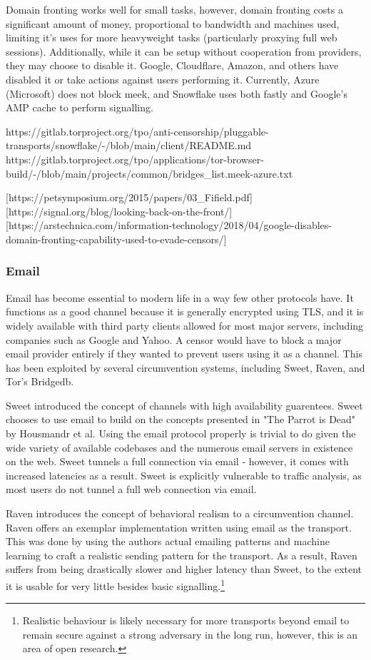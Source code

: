 \documentclass[12pt]{report}
\begin{document}
Domain fronting works well for small tasks, however, domain fronting costs a significant amount of money, proportional to bandwidth and machines used, limiting it's uses for more heavyweight tasks (particularly proxying full web sessions). Additionally, while it can be setup without cooperation from providers, they may choose to disable it. Google, Cloudflare, Amazon, and others have disabled it or take actions against users performing it. Currently, Azure (Microsoft) does not block meek, and Snowflake uses both fastly and Google's AMP cache to perform signalling.

https://gitlab.torproject.org/tpo/anti-censorship/pluggable-transports/snowflake/-/blob/main/client/README.md
https://gitlab.torproject.org/tpo/applications/tor-browser-build/-/blob/main/projects/common/bridges_list.meek-azure.txt

[https://petsymposium.org/2015/papers/03_Fifield.pdf]
[https://signal.org/blog/looking-back-on-the-front/]
[https://arstechnica.com/information-technology/2018/04/google-disables-domain-fronting-capability-used-to-evade-censors/]

\subsubsection{Email}

Email has become essential to modern life in a way few other protocols have. It functions as a good channel because it is generally encrypted using TLS, and it is widely available with third party clients allowed for most major servers, including companies such as Google and Yahoo. A censor would have to block a major email provider entirely if they wanted to prevent users using it as a channel. This has been exploited by several circumvention systems, including Sweet, Raven, and Tor's Bridgedb.

Sweet introduced the concept of channels with high availability guarentees. Sweet chooses to use email to build on the concepts presented in "The Parrot is Dead" by Housmandr et al.\cite{parrot} Using the email protocol properly is trivial to do given the wide variety of available codebases and the numerous email servers in existence on the web. Sweet tunnels a full connection via email - however, it comes with increased latencies as a result. Sweet is explicitly vulnerable to traffic analysis, as most users do not tunnel a full web connection via email.\cite{sweet}

Raven introduces the concept of behavioral realism to a circumvention channel. Raven offers an exemplar implementation written using email as the transport. This was done by using the authors actual emailing patterns and machine learning to craft a realistic sending pattern for the transport. As a result, Raven suffers from being drastically slower and higher latency than Sweet, to the extent it is usable for very little besides basic signalling.\footnote{Realistic behaviour is likely necessary for more transports beyond email to remain secure against a strong adversary in the long run, however, this is an area of open research.}\cite{raven}
\end{document}
